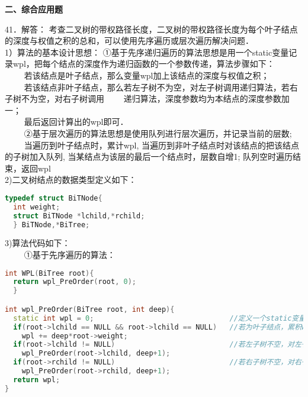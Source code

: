 \textbf{二、综合应用题}

41．解答： 考查二叉树的带权路径长度，二叉树的带权路径长度为每个叶子结点的深度与权值之积的总和，可以使用先序遍历或层次遍历解决问题． \\

1）算法的基本设计思想： ①基于先序递归遍历的算法思想是用一个static变量记录wpl，把每个结点的深度作为递归函数的一个参数传递，算法步骤如下：  \\
$\qquad$ 若该结点是叶子结点，那么变量wpl加上该结点的深度与权值之积； \\
$\qquad$ 若该结点非叶子结点，那么若左子树不为空，对左子树调用递归算法，若右子树不为空，对右子树调用$\qquad$ 递归算法，深度参数均为本结点的深度参数加一； \\
$\qquad$ 最后返回计算出的wpl即可． \\
$\qquad$ ②基于层次遍历的算法思想是使用队列进行层次遍历，并记录当前的层数; \\
$\qquad$ 当遍历到叶子结点时，累计wpl, 当遍历到非叶子结点时对该结点的把该结点的子树加入队列, 当某结点为该层的最后一个结点时，层数自增1; 队列空时遍历结束，返回wpl \\

2)二叉树结点的数据类型定义如下：
\begin{lstlisting}[language=cpp]
typedef struct BiTNode{ 
  int weight; 
  struct BiTNode *lchild,*rchild; 
  } BiTNode,*BiTree;
\end{lstlisting}

3)算法代码如下： \\
$\qquad$ ①基于先序遍历的算法：
\begin{lstlisting}[language=cpp]
int WPL(BiTree root){ 
  return wpl_PreOrder(root, 0); 
  }

int wpl_PreOrder(BiTree root, int deep){ 
  static int wpl = 0;                                //定义一个static变量存储wpl
  if(root->lchild == NULL && root->lchild == NULL)   //若为叶子结点，累积wpl 
    wpl += deep*root->weight;
  if(root->lchild != NULL)                           //若左子树不空，对左子树递归遍历
    wpl_PreOrder(root->lchild, deep+1);
  if(root->rchild != NULL)                           //若右子树不空，对右子树递归遍历
    wpl_PreOrder(root->rchild, deep+1);
  return wpl;
}
\end{lstlisting}

